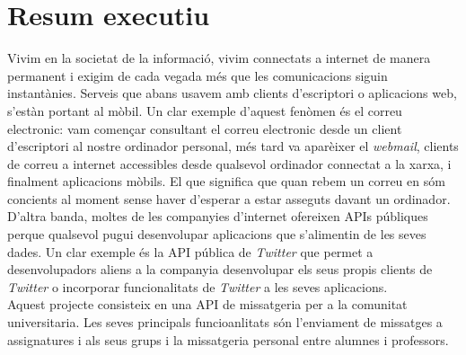 
\chapter{Resum executiu}

Vivim en la societat de la informació, vivim connectats a internet de manera permanent i exigim de cada vegada més que les comunicacions siguin instantànies. Serveis que abans usavem amb clients d'escriptori o aplicacions web, s'estàn portant al mòbil. Un clar exemple d'aquest fenòmen és el correu electronic: vam començar consultant el correu electronic desde un client d'escriptori al nostre ordinador personal, més tard va aparèixer el \emph{webmail}, clients de correu a internet accessibles desde qualsevol ordinador connectat a la xarxa, i finalment aplicacions mòbils. El que significa que quan rebem un correu en sóm concients al moment sense haver d'esperar a estar asseguts davant un ordinador.\\

D'altra banda, moltes de les companyies d'internet ofereixen APIs públiques perque qualsevol pugui desenvolupar aplicacions que s'alimentin de les seves dades. Un clar exemple és la API pública de \emph{Twitter} que permet a desenvolupadors aliens a la companyia desenvolupar els seus propis clients de \emph{Twitter }o incorporar funcionalitats de \emph{Twitter} a les seves aplicacions. \\

Aquest projecte consisteix en una API de missatgeria per a la comunitat universitaria. Les seves principals funcioanlitats són l'enviament de missatges a assignatures i als seus grups i la missatgeria personal entre alumnes i professors.\\